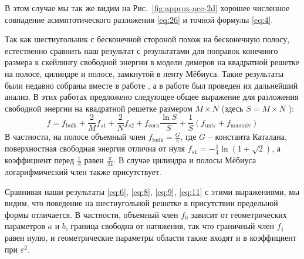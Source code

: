 \documentclass{article}
\begin{document}
В этом случае мы так же видим на Рис.~\ref{fig:approx-acc-2d} хорошее численное совпадение
асимптотического разложения \eqref{eq:26} и точной формулы  \eqref{eq:4}. 

Так как шестиугольник с бесконечной стороной похож на бесконечную полосу, естественно сравнить наш
результат с результатами для поправок конечного размера к скейлингу свободной энергии в модели
димеров на квадратной решетке на полосе, цилиндре и полосе, замкнутой в ленту Мёбиуса. Такие
результаты были недавно собраны вместе в работе \cite{izmailian2017finite}, а в работе
\cite{Sh_Izmailian_2019} был проведен их дальнейший анализ. В этих работах предложено следующее
общее выражение для разложения свободной энергии на квадратной решетке размером $M\times N$ (здесь
$S=M\times N$ ): 
\begin{equation}
  \label{eq:32}
  f=f_{\mathrm{bulk}}+\frac{2}{M}f_{s1}+\frac{2}{N}f_{s2}
  +f_{\mathrm{corn}}\frac{\ln S}{S} +\frac{1}{S} (f_{\mathrm{univ}}+f_{\mathrm{nonuniv}})
\end{equation}
В частности, на полосе объемный член $f_{\mathrm{bulk}}=\frac{G}{\pi}$, где  $G$ -- константа
Каталана, поверхностная свободная энергия отлична от нуля $f_{s1}=-\frac{1}{4}\ln(1+\sqrt{2})$, а
коэффициент перед  $\frac{1}{S}$ равен  $\frac{\pi}{24}$. В случае цилиндра и полосы Мёбиуса
логарифмический член также присутствует. 

Сравнивая наши результаты \eqref{eq:6}, \eqref{eq:8}, \eqref{eq:9}, \eqref{eq:11} с этими
выражениями, мы видим, что поведение на шестиугольной решетке в присутствии предельной формы
отличается. В частности, объемный член $f_{0}$ зависит от геометрических параметров $a$ и  $b$,
граница свободна от натяжения, так что граничный член $f_{1}$ равен нулю, и геометрические параметры
области также входят и в коэффициент при $\varepsilon^{2}$. 
\end{document}
